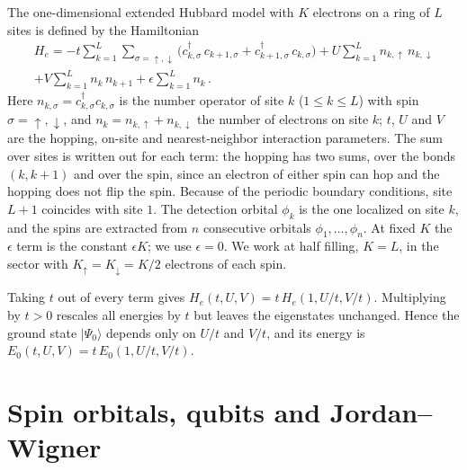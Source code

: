 \documentclass[11pt,a4paper]{article}
\newcommand{\cd}{c^\dagger}
\newcommand{\up}{\uparrow}
\newcommand{\dn}{\downarrow}
\begin{document}
The one-dimensional extended Hubbard model with $K$ electrons on a ring of $L$
sites is defined by the Hamiltonian
\begin{gather}
{H}_e = - t \sum_{k=1}^L \sum_{\sigma=\uparrow,\downarrow} \big({c}_{k,\sigma}^\dagger\,{c}_{k+1,\sigma} + {c}_{k+1,\sigma}^\dagger\,{c}_{k,\sigma}\big)
+ U \sum_{k=1}^L {n}_{k,\uparrow}\,{n}_{k,\downarrow} \nonumber\\
+ V \sum_{k=1}^L {n}_{k}\,{n}_{k+1} + \epsilon \sum_{k=1}^L {n}_{k}\,.
\label{eq:H}
\end{gather}
Here $n_{k,\sigma} = \cd_{k,\sigma} c_{k,\sigma}$ is the number operator of
site $k$ ($1 \le k \le L$) with spin $\sigma = \up, \dn$, and
$n_k = n_{k,\up} + n_{k,\dn}$ the number of electrons on site $k$; $t$, $U$ and
$V$ are the hopping, on-site and nearest-neighbor interaction parameters. The
sum over sites is written out for each term: the hopping has two sums, over the bonds $(k, k+1)$ and over the
spin, since an electron of either spin can hop and the hopping does not flip
the spin. Because of the periodic boundary conditions, site $L+1$ coincides
with site $1$. The detection orbital $\phi_k$ is the one localized on site $k$,
and the spins are extracted from $n$ consecutive orbitals
$\phi_1, \dots, \phi_n$. At fixed $K$ the $\epsilon$ term is the constant
$\epsilon K$; we use $\epsilon = 0$. We work
at half filling, $K = L$, in the sector with $K_\up = K_\dn = K/2$ electrons of
each spin.

Taking $t$ out of every term gives $H_e(t,U,V) = t\, H_e(1, U/t, V/t)$.
Multiplying by $t > 0$ rescales all energies by $t$ but leaves the eigenstates
unchanged. Hence the ground state $|\Psi_0\rangle$ depends only on $U/t$ and
$V/t$, and its energy is $E_0(t,U,V) = t\, E_0(1, U/t, V/t)$.

\section{Spin orbitals, qubits and Jordan--Wigner}\label{sec:jw}
\end{document}
